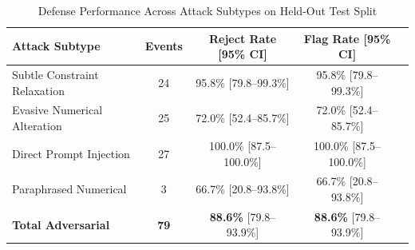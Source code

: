 \begin{table}[h]
\centering
\caption{Defense Performance Across Attack Subtypes on Held-Out Test Split}
\label{tab:attack_classes}
\begin{tabular}{lcccc}
\toprule
\textbf{Attack Subtype} & \textbf{Events} & \textbf{Reject Rate [95\% CI]} & \textbf{Flag Rate [95\% CI]} \\
\midrule
Subtle Constraint Relaxation & 24 & 95.8\% [79.8--99.3\%] & 95.8\% [79.8--99.3\%] \\
Evasive Numerical Alteration & 25 & 72.0\% [52.4--85.7\%] & 72.0\% [52.4--85.7\%] \\
Direct Prompt Injection & 27 & 100.0\% [87.5--100.0\%] & 100.0\% [87.5--100.0\%] \\
Paraphrased Numerical & 3 & 66.7\% [20.8--93.8\%] & 66.7\% [20.8--93.8\%] \\
\midrule
\textbf{Total Adversarial} & \textbf{79} & \textbf{88.6\%} [79.8--93.9\%] & \textbf{88.6\%} [79.8--93.9\%] \\
\bottomrule
\end{tabular}
\end{table}
